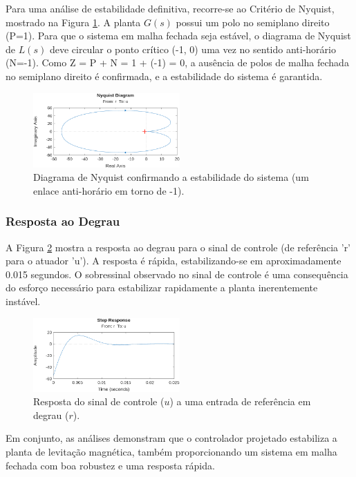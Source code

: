 Para uma análise de estabilidade definitiva, recorre-se ao Critério de Nyquist, mostrado na Figura \ref{fig:nyquist}. A planta $G(s)$ possui um polo no semiplano direito (P=1). Para que o sistema em malha fechada seja estável, o diagrama de Nyquist de $L(s)$ deve circular o ponto crítico (-1, 0) uma vez no sentido anti-horário (N=-1). Como Z = P + N = 1 + (-1) = 0, a ausência de polos de malha fechada no semiplano direito é confirmada, e a estabilidade do sistema é garantida.

\begin{figure}[ht!]
    \centering
    \includegraphics[width=0.5\textwidth]{nyquist.png}
    \caption{Diagrama de Nyquist confirmando a estabilidade do sistema (um enlace anti-horário em torno de -1).}
    \label{fig:nyquist}
\end{figure}
\newpage
\subsubsection{Resposta ao Degrau}

A Figura \ref{fig:step_response} mostra a resposta ao degrau para o sinal de controle (de referência 'r' para o atuador 'u'). A resposta é rápida, estabilizando-se em aproximadamente 0.015 segundos. O sobressinal observado no sinal de controle é uma consequência do esforço necessário para estabilizar rapidamente a planta inerentemente instável.

\begin{figure}[ht!]
    \centering
    \includegraphics[width=0.5\textwidth]{step_resp.png}
    \caption{Resposta do sinal de controle ($u$) a uma entrada de referência em degrau ($r$).}
    \label{fig:step_response}
\end{figure}

Em conjunto, as análises demonstram que o controlador projetado estabiliza a planta de levitação magnética, também proporcionando um sistema em malha fechada com boa robustez e uma resposta rápida.

